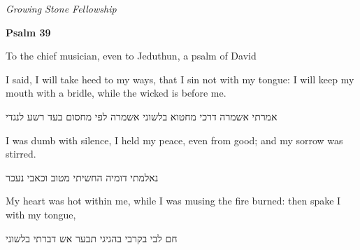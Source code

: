 \documentclass[dark]{gsf-presentation}
\begin{document}
\begin{frame}[plain]
	\begin{center}
		\textit{\Large Growing Stone Fellowship}

		\vspace{3mm}
		\textbf{\huge Psalm 39}

		\vspace{5mm}
		\textcolor{SecondColor}{
			\Large
			To the chief musician, even to Jeduthun, a 
			psalm of David
		}

	\end{center}
\end{frame}

\setcounter{framenumber}{0}

\begin{frame}
	\LARGE
	\begin{english}
		\begin{center}
			I said, I will take heed to my ways, that I sin
			not with my tongue: I will keep my mouth with
			a bridle, while the wicked is before me.
		\end{center}
	\end{english}

	\begin{hebrew}
		\begin{center}
			אמרתי אשמרה דרכי מחטוא בלשוני אשמרה לפי מחסום 
			בעד רשע לנגדי
		\end{center}
	\end{hebrew}
\end{frame}

\begin{frame}
	\LARGE
	\begin{english}
		\begin{center}
			I was dumb with silence, I held my peace,
			even from good; and my sorrow was stirred.
		\end{center}
	\end{english}

	\begin{hebrew}
		\begin{center}
			נאלמתי דומיה החשיתי מטוב וכאבי נעכר
		\end{center}
	\end{hebrew}
\end{frame}

\begin{frame}
	\LARGE
	\begin{english}
		\begin{center}
			My heart was hot within me, while I was musing
			the fire burned: then spake I with my tongue,
		\end{center}
	\end{english}

	\begin{hebrew}
		\begin{center}
			חם לבי בקרבי בהגיגי תבער אש דברתי בלשוני 
		\end{center}
	\end{hebrew}
\end{frame}
\end{document}
